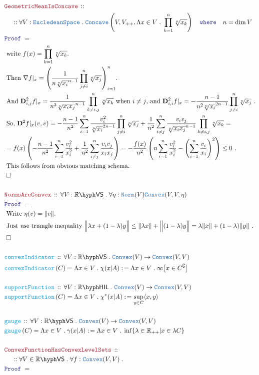 \documentclass[12pt]{scrartcl}
\newcommand{\TYPE}[1]{\textcolor{NavyBlue}{\mathtt{#1}}}
\newcommand{\FUNC}[1]{\textcolor{Cerulean}{\mathtt{#1}}}
\newcommand{\LOGIC}[1]{\textcolor{Blue}{\mathtt{#1}}}
\newcommand{\THM}[1]{\textcolor{Maroon}{\mathtt{#1}}}
\renewcommand{\.}{\; . \;}
\newcommand{\de}{: \kern 0.1pc =}
\newcommand{\where}{\LOGIC{where}}
\newcommand{\Act}[1]{\left( #1 \right)}
\newcommand{\Theorem}[2]{& \THM{#1} \, :: \, #2 \\ & \Proof = \\ }
\newcommand{\DeclareFunc}[2]{& \FUNC{#1} \, :: \, #2 \\}
\newcommand{\DefineNamedFunc}[4]{&  \FUNC{#1}\Act{#2} = #3 \de #4 \\}
\newcommand{\NewLine}{\\ & \kern 1pc}
\newcommand{\Page}[1]{ \begin{align*} #1 \end{align*}   }
\newcommand{\Reals}{\mathbb{R} }
\renewcommand{\c}{\complement}
\newcommand{\QED}{\; \square}
\newcommand{\EndProof}{& \QED \\}
\newcommand{\Proof}{\LOGIC{Proof} \; }
\newcommand{\Explain}[1]{& \text{#1.} \\}
\newcommand{\ExplainFurther}[1]{& \text{#1} \\}
\newcommand{\VS}[1]{#1\hyph\mathsf{VS}} %
\newcommand{\Convex}{\TYPE{Convex}}
\newcommand{\Euc}{\TYPE{EucledeanSpace}}
\newcommand{\Concave}{\TYPE{Concave}}
\newcommand{\D}{\mathbf{D}}
\begin{document}
\Page{
	\Theorem{GeometricMeanIsConcave}
	{
		\NewLine ::		
		\forall V : \Euc \.
		\Concave\left( V, V_{++}, \Lambda x \in V \.  \prod^n_{k=1} \sqrt[n]{x_k}   \right)
		\quad \where \quad n = \dim V
	}
	\Explain{ write $f(x) = \prod^n_{k=1} \sqrt[n]{x_k}$}
	\Explain{
		Then $\nabla f|_x  = \left( \frac{1}{n\sqrt[n]{x_i}^{n-1}} \prod^n_{j\neq i} \sqrt[n]{x_j} \right)^n_{i=1} $}
	\Explain{
		And $\D^2_{i,j} f|_x = \frac{1}{n^2\sqrt[n]{x_i x_j}^{n-1}} \prod^n_{k \neq i,j} \sqrt[n]{x_k}$ 
		when $i \neq j$, and
		$\D^2_{i,i} f|_x =   -\frac{n-1}{n^2\sqrt[n]{x_i}^{2n-1}} \prod^n_{j\neq i} \sqrt[n]{x_j}$ }
	\ExplainFurther{
		So,
		$\D^2 f|_x(v,v) = -\frac{n-1}{n^2}\sum^n_{i=1}  
			\frac{v_i^2}{\sqrt[n]{x_i}^{2n-1}} \prod^n_{j\neq i} \sqrt[n]{x_j}  
			+   \frac{1}{n^2}\sum^n_{i\neq j} \frac{v_i v_j}{\sqrt[n]{x_i x_j}^{n-1}} \prod^n_{k \neq i,j} \sqrt[n]{x_k}	
			=$}
	\Explain{
		$
				=f(x)\left(  -\frac{n-1}{n^2} \sum^n_{i=1} \frac{v_i^2}{x_i^2} +        
				\frac{1}{n^2} \sum^n_{i\neq j} \frac{v_i v_j}{x_i x_j} \right) =
				-\frac{f(x)}{n^2}\left( n \sum^n_{i=1} \frac{v_i^2}{x_i^2} - 
				\left(\sum^n_{i=1} \frac{v_i}{x_i}\right)^2     \right) \le 0	
		$
		}
	\Explain{ This follows from obvious matching schema}
	\EndProof
	\\
	\Theorem{NormsAreConvex}
	{
		\forall V : \VS{\Reals} \.
		\forall \eta : \TYPE{Norm}(V)
		\Convex(V,V,\eta)
	}
	\Explain{
		Write $\eta(v) = \|v\|$}
	\Explain{ 
		Just use triangle inequality
		$\Big\| \lambda x + (1 - \lambda) y \Big\|  \le 
		\| \lambda x \| + \Big\| (1 - \lambda) y \Big\| = 
		\lambda \|x\| + (1 - \lambda) \|y\|$	}
	\EndProof
	\\
	\DeclareFunc{convexIndicator}
	{
		\forall V : \VS{\Reals} \.
		\Convex(V) \to \Convex(V,V)
	}
	\DefineNamedFunc{convexIndicator}{C}{\Lambda x \in V \. \chi(x|A)}{
			\Lambda x \in V \.  \infty\big[x \in C^\c\big]
	}
	\\
	\DeclareFunc{supportFunction}
	{
		\forall V : \Reals\hyph\mathsf{HIL} \.
		\Convex(V) \to \Convex(V,V)
	}
	\DefineNamedFunc{supportFunction}{C}{\Lambda x \in V \. \chi^*(x|A)}{
			\sup_{y \in C} \langle x,y \rangle
	}
	\\
	\DeclareFunc{gauge}
	{
		\forall V : \VS{\Reals} \.
		\Convex(V) \to \Convex(V,V)
	}
	\DefineNamedFunc{gauge}{C}{\Lambda x \in V \. \gamma(x|A)}{
			\Lambda x \in V \. \inf \{ \lambda \in \Reals_{++} | x \in \lambda C \}
	}
	\\
	\Theorem{ConvexFunctionHasConvexLevelSets}
	{
		\NewLine ::		
		\forall V \in \VS{\Reals} \.
		\forall f : \Convex(V,V) \.
}}
\end{document}
